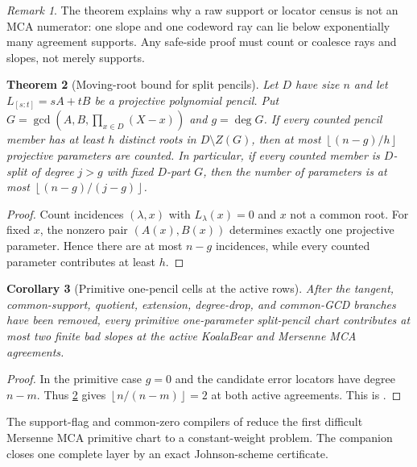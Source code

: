 \documentclass[11pt,a4paper]{amsart}
\numberwithin{equation}{section}
\newtheorem{theorem}{Theorem}[section]
\newtheorem{corollary}[theorem]{Corollary}
\theoremstyle{remark}
\newtheorem{remark}[theorem]{Remark}
\newcommand{\floor}[1]{\left\lfloor#1\right\rfloor}
\begin{document}
\begin{remark}
The theorem explains why a raw support or locator census is not an MCA numerator: one slope and one codeword ray can lie below exponentially many agreement supports.  Any safe-side proof must count or coalesce rays and slopes, not merely supports.
\end{remark}

\begin{theorem}[Moving-root bound for split pencils]\label{thm:moving-root}
Let $D$ have size $n$ and let $L_{[s:t]}=sA+tB$ be a projective polynomial pencil.  Put $G=\gcd(A,B,\prod_{x\in D}(X-x))$ and $g=\deg G$.  If every counted pencil member has at least $h$ distinct roots in $D\setminus Z(G)$, then at most $\floor{(n-g)/h}$ projective parameters are counted.  In particular, if every counted member is $D$-split of degree $j>g$ with fixed $D$-part $G$, then the number of parameters is at most $\floor{(n-g)/(j-g)}$.
\end{theorem}

\begin{proof}
Count incidences $(\lambda,x)$ with $L_\lambda(x)=0$ and $x$ not a common root.  For fixed $x$, the nonzero pair $(A(x),B(x))$ determines exactly one projective parameter.  Hence there are at most $n-g$ incidences, while every counted parameter contributes at least $h$.
\end{proof}

\begin{corollary}[Primitive one-pencil cells at the active rows]\label{cor:one-pencil-two}
After the tangent, common-support, quotient, extension, degree-drop, and common-GCD branches have been removed, every primitive one-parameter split-pencil chart contributes at most two finite bad slopes at the active KoalaBear and Mersenne MCA agreements.
\end{corollary}

\begin{proof}
In the primitive case $g=0$ and the candidate error locators have degree $n-m$.  Thus \cref{thm:moving-root} gives $\floor{n/(n-m)}=2$ at both active agreements.  This is \cite[Corollary ``BC is settled on primitive one-parameter locator pencils'']{ChoGF26}.
\end{proof}

The support-flag and common-zero compilers of \cite{ChoGF26} reduce the first difficult Mersenne MCA primitive chart to a constant-weight problem.  The companion \cite{ChoComp26} closes one complete layer by an exact Johnson-scheme certificate.
\end{document}

